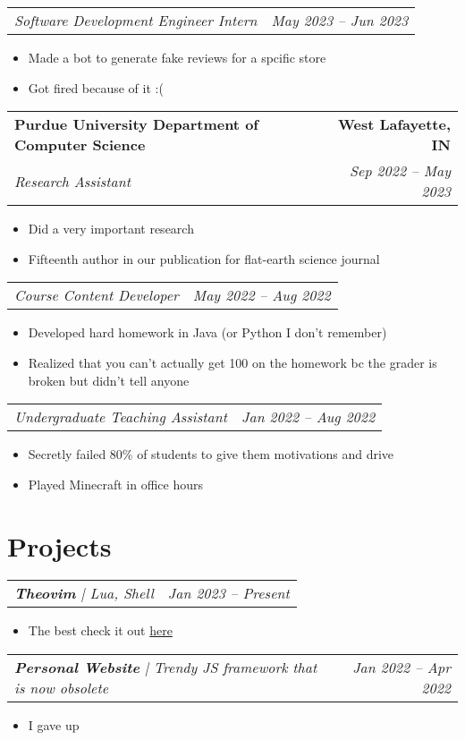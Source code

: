 \documentclass[letterpaper,11pt]{article} %
\makeatletter
\newcommand{\fourItems}[4]{
  \begin{tabular*}{1.0\textwidth}[t]{l@{\extracolsep{\fill}}r}
    \textbf{\large #1} & \textbf{\small #2} \\
    \textit{\large #3} & \textit{\small #4} \\
  \end{tabular*}

  \vspace*{-0.5em}
}
\newcommand{\twoItems}[2]{
  \begin{tabular*}{1.0\textwidth}{l@{\extracolsep{\fill}}r}
    \textit{\large #1} & \textit{\small #2} \\
  \end{tabular*}

  \vspace*{-0.5em} %
}
\newenvironment{tightItemize}
  {\begin{itemize}[itemsep=-0.3em]}
  {\end{itemize}\vspace*{-0.5em}}
\makeatother
\begin{document}
\twoItems{Software Development Engineer Intern}{May 2023 -- Jun 2023}
\begin{tightItemize}
  \item Made a bot to generate fake reviews for a spcific store
  \item Got fired because of it :(
\end{tightItemize}

\fourItems{Purdue University Department of Computer Science}{West Lafayette, IN}
{Research Assistant}{Sep 2022 -- May 2023}
\begin{tightItemize}
  \item Did a very important research
  \item Fifteenth author in our publication for flat-earth science journal
\end{tightItemize}

\twoItems{Course Content Developer}{May 2022 -- Aug 2022}
\begin{tightItemize}
  \item Developed hard homework in Java (or Python I don't remember)
  \item Realized that you can't actually get 100 on the homework bc the grader is broken but didn't tell anyone
\end{tightItemize}

\twoItems{Undergraduate Teaching Assistant}{Jan 2022 -- Aug 2022}
\begin{tightItemize}
  \item Secretly failed 80\% of students to give them motivations and drive
  \item Played Minecraft in office hours
\end{tightItemize}


\section{Projects}

\twoItems{\textbf{Theovim}{ | }\textit{Lua, Shell}}{Jan 2023 -- Present}
\begin{tightItemize}
  \item The best check it out \href{https://github.com/theopn/theovim}{here}
\end{tightItemize}

\twoItems{\textbf{Personal Website}{ | }\textit{Trendy JS framework that is now obsolete}}{Jan 2022 -- Apr 2022}
\begin{tightItemize}
  \item I gave up
\end{tightItemize}
\end{document}

